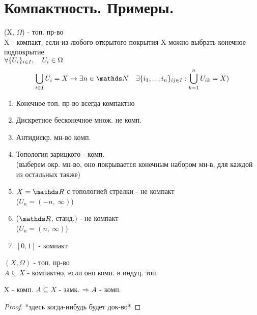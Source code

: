 \documentclass[geometry.tex]{subfiles}
\begin{document}
  \section{Компактность. Примеры.}

  \begin{definition}
      (X, $\Omega$) - топ. пр-во\\
      X - компакт, если из любого открытого покрытия X можно выбрать конечное подпокрытие\\
      $\forall \{U_i\}_{i \in I},\quad U_i \in \Omega$
      \[\bigcup_{i \in I}U_i = X \ra \exists n \in \N \q \exists \{i_1, ..., i_n\}_{ij \in I}: \bigcup_{k = 1}^n U_{ik} = X)\]
  \end{definition}

  \begin{examples}
      \begin{enumerate}
          \item Конечное топ. пр-во всегда компактно
          \item Дискретное бесконечное множ. не комп.
          \item Антидискр. мн-во комп.
          \item Топология зарицкого - комп.\\
          (выберем окр. мн-во, оно покрывается конечным набором мн-в, для каждой из остальных также)
          \item $X = \R$ с топологией стрелки - не компакт\\
          ($U_n = (-n,\ \infty)$)
          \item ($\R$, станд.) - не компакт\\
          ($U_n = (n,\ \infty)$)
          \item $[0, 1]$ - компакт
      \end{enumerate}
  \end{examples}

  \begin{definition}
      $(X, \Omega)$ - топ. пр-во\\
      $A \subseteq X$ - компактно, если оно комп. в индуц. топ.
  \end{definition}

  \begin{theorem}
      X - комп. $A \subseteq X$ - замк. $\Rightarrow A$ - комп.
  \end{theorem}

  \begin{proof}
    *здесь когда-нибудь будет док-во*
  \end{proof}
\end{document}
